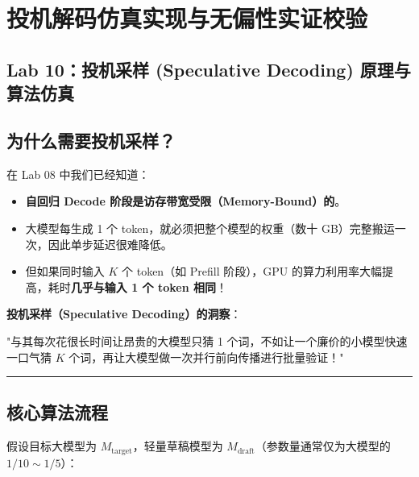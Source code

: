 \chapter{投机解码仿真实现与无偏性实证校验}

\section{Lab 10：投机采样 (Speculative Decoding) 原理与算法仿真}

\section{为什么需要投机采样？}

在 Lab 08 中我们已经知道：
\begin{itemize}
  \item \textbf{自回归 Decode 阶段是访存带宽受限（Memory-Bound）的}。
  \item 大模型每生成 1 个 token，就必须把整个模型的权重（数十 GB）完整搬运一次，因此单步延迟很难降低。
  \item 但如果同时输入 $K$ 个 token（如 Prefill 阶段），GPU 的算力利用率大幅提高，耗时\textbf{几乎与输入 1 个 token 相同}！
\end{itemize}

\textbf{投机采样（Speculative Decoding）的洞察}：
\begin{noteBox}[核心导读与背景]
"与其每次花很长时间让昂贵的大模型只猜 1 个词，不如让一个廉价的小模型快速一口气猜 $K$ 个词，再让大模型做一次并行前向传播进行批量验证！"
\end{noteBox}

\vspace{0.8em}\hrule\vspace{0.8em}

\section{核心算法流程}

假设目标大模型为 $M_{\text{target}}$，轻量草稿模型为 $M_{\text{draft}}$（参数量通常仅为大模型的 $1/10 \sim 1/5$）：

